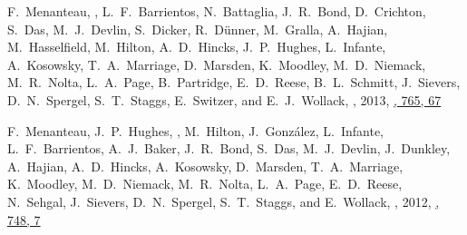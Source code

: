 \item
F.~Menanteau, \myself, L.~F.~Barrientos, N.~Battaglia, J.~R.~Bond, D.~Crichton, S.~Das, M.~J.~Devlin, S.~Dicker, R.~Dünner, M.~Gralla, A.~Hajian, M.~Hasselfield, M.~Hilton, A.~D.~Hincks, J.~P.~Hughes, L.~Infante, A.~Kosowsky, T.~A.~Marriage, D.~Marsden, K.~Moodley, M.~D.~Niemack, M.~R.~Nolta, L.~A.~Page, B.~Partridge, E.~D.~Reese, B.~L.~Schmitt, J.~Sievers, D.~N.~Spergel, S.~T.~Staggs, E.~Switzer, and E.~J.~Wollack,
,
2013, \href{https://ui.adsabs.harvard.edu/abs/2013ApJ...765...67M}{\apj, 765, 67}

\item
F.~Menanteau, J.~P.~Hughes, \myself, M.~Hilton, J.~González, L.~Infante, L.~F.~Barrientos, A.~J.~Baker, J.~R.~Bond, S.~Das, M.~J.~Devlin, J.~Dunkley, A.~Hajian, A.~D.~Hincks, A.~Kosowsky, D.~Marsden, T.~A.~Marriage, K.~Moodley, M.~D.~Niemack, M.~R.~Nolta, L.~A.~Page, E.~D.~Reese, N.~Sehgal, J.~Sievers, D.~N.~Spergel, S.~T.~Staggs, and E.~Wollack,
,
2012, \href{https://ui.adsabs.harvard.edu/abs/2012ApJ...748....7M}{\apj, 748, 7}



